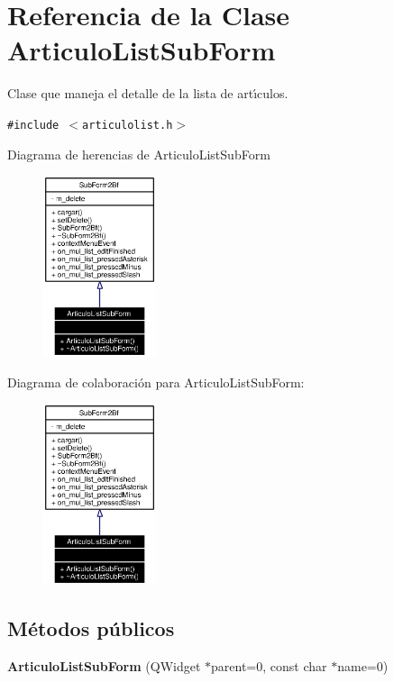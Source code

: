 \section{Referencia de la Clase Articulo\-List\-Sub\-Form}
\label{classArticuloListSubForm}
Clase que maneja el detalle de la lista de art\'{\i}culos.  


{\tt \#include $<$articulolist.h$>$}

Diagrama de herencias de Articulo\-List\-Sub\-Form\begin{figure}[H]
\begin{center}
\leavevmode
\includegraphics[width=94pt]{classArticuloListSubForm__inherit__graph}
\end{center}
\end{figure}
Diagrama de colaboraci\'{o}n para Articulo\-List\-Sub\-Form:\begin{figure}[H]
\begin{center}
\leavevmode
\includegraphics[width=94pt]{classArticuloListSubForm__coll__graph}
\end{center}
\end{figure}
\subsection*{M\'{e}todos p\'{u}blicos}
\begin{CompactItemize}
\item 
{\bf Articulo\-List\-Sub\-Form} (QWidget $\ast$parent=0, const char $\ast$name=0)
\end{CompactItemize}


